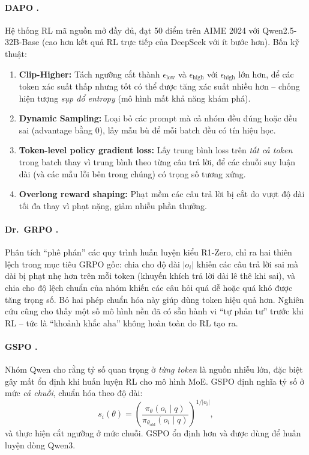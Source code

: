 \paragraph{DAPO \cite{yu2025dapo}.} Hệ thống RL mã nguồn mở đầy đủ, đạt 50 điểm trên AIME 2024 với Qwen2.5-32B-Base (cao hơn kết quả RL trực tiếp của DeepSeek với ít bước hơn). Bốn kỹ thuật:
\begin{enumerate}
	\item \textbf{Clip-Higher:} Tách ngưỡng cắt thành $\epsilon_{\text{low}}$ và $\epsilon_{\text{high}}$ với $\epsilon_{\text{high}}$ lớn hơn, để các token xác suất thấp nhưng tốt có thể được tăng xác suất nhiều hơn -- chống hiện tượng \emph{sụp đổ entropy} (mô hình mất khả năng khám phá).
	\item \textbf{Dynamic Sampling:} Loại bỏ các prompt mà cả nhóm đều đúng hoặc đều sai (advantage bằng 0), lấy mẫu bù để mỗi batch đều có tín hiệu học.
	\item \textbf{Token-level policy gradient loss:} Lấy trung bình loss trên \emph{tất cả token} trong batch thay vì trung bình theo từng câu trả lời, để các chuỗi suy luận dài (và các mẫu lỗi bên trong chúng) có trọng số tương xứng.
	\item \textbf{Overlong reward shaping:} Phạt mềm các câu trả lời bị cắt do vượt độ dài tối đa thay vì phạt nặng, giảm nhiễu phần thưởng.
\end{enumerate}

\paragraph{Dr.~GRPO \cite{liu2025drgrpo}.} Phân tích “phê phán” các quy trình huấn luyện kiểu R1-Zero, chỉ ra hai thiên lệch trong mục tiêu GRPO gốc: chia cho độ dài $|o_i|$ khiến các câu trả lời sai mà dài bị phạt nhẹ hơn trên mỗi token (khuyến khích trả lời dài lê thê khi sai), và chia cho độ lệch chuẩn của nhóm khiến các câu hỏi quá dễ hoặc quá khó được tăng trọng số. Bỏ hai phép chuẩn hóa này giúp dùng token hiệu quả hơn. Nghiên cứu cũng cho thấy một số mô hình nền đã có sẵn hành vi “tự phản tư” trước khi RL -- tức là “khoảnh khắc aha” không hoàn toàn do RL tạo ra.

\paragraph{GSPO \cite{zheng2025gspo}.} Nhóm Qwen cho rằng tỷ số quan trọng ở \emph{từng token} là nguồn nhiễu lớn, đặc biệt gây mất ổn định khi huấn luyện RL cho mô hình MoE. GSPO định nghĩa tỷ số ở mức \emph{cả chuỗi}, chuẩn hóa theo độ dài:
\[
s_i(\theta) = \left(\frac{\pi_\theta(o_i\mid q)}{\pi_{\theta_{\text{old}}}(o_i\mid q)}\right)^{1/|o_i|},
\]
và thực hiện cắt ngưỡng ở mức chuỗi. GSPO ổn định hơn và được dùng để huấn luyện dòng Qwen3.

